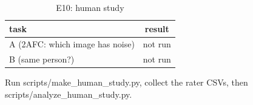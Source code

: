 \begin{table}[t]
\centering
\small
\begin{tabular}{lc}
\toprule
task & result \\
\midrule
A (2AFC: which image has noise) & not run \\
B (same person?) & not run \\
\bottomrule
\end{tabular}
\caption{E10: human study}
\label{tab:e10}
\par\footnotesize Run scripts/make\_human\_study.py, collect the rater CSVs, then scripts/analyze\_human\_study.py.
\end{table}
